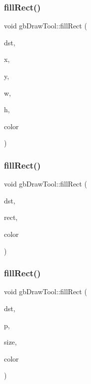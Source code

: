 \subsubsection{\texorpdfstring{fillRect()}{fillRect()}\hspace{0.1cm}{\footnotesize\ttfamily [1/3]}}
{\footnotesize\ttfamily void gb\+Draw\+Tool\+::fill\+Rect (\begin{DoxyParamCaption}\item[{S\+D\+L\+\_\+\+Texture $\ast$}]{dst,  }\item[{int}]{x,  }\item[{int}]{y,  }\item[{int}]{w,  }\item[{int}]{h,  }\item[{\mbox{\hyperlink{classgb_color}{gb\+Color}}}]{color }\end{DoxyParamCaption})}

\mbox{\label{classgb_draw_tool_a596096946e38b7de8ec4a2f990657218}} 
\subsubsection{\texorpdfstring{fillRect()}{fillRect()}\hspace{0.1cm}{\footnotesize\ttfamily [2/3]}}
{\footnotesize\ttfamily void gb\+Draw\+Tool\+::fill\+Rect (\begin{DoxyParamCaption}\item[{S\+D\+L\+\_\+\+Texture $\ast$}]{dst,  }\item[{\mbox{\hyperlink{classgb_rect}{gb\+Rect}}}]{rect,  }\item[{\mbox{\hyperlink{classgb_color}{gb\+Color}}}]{color }\end{DoxyParamCaption})}

\mbox{\label{classgb_draw_tool_acfcce703c9a678b983f3d0313ddbdd6c}} 
\subsubsection{\texorpdfstring{fillRect()}{fillRect()}\hspace{0.1cm}{\footnotesize\ttfamily [3/3]}}
{\footnotesize\ttfamily void gb\+Draw\+Tool\+::fill\+Rect (\begin{DoxyParamCaption}\item[{S\+D\+L\+\_\+\+Texture $\ast$}]{dst,  }\item[{\mbox{\hyperlink{classgb_point}{gb\+Point}}}]{p,  }\item[{\mbox{\hyperlink{classgb_size}{gb\+Size}}}]{size,  }\item[{\mbox{\hyperlink{classgb_color}{gb\+Color}}}]{color }\end{DoxyParamCaption})}



